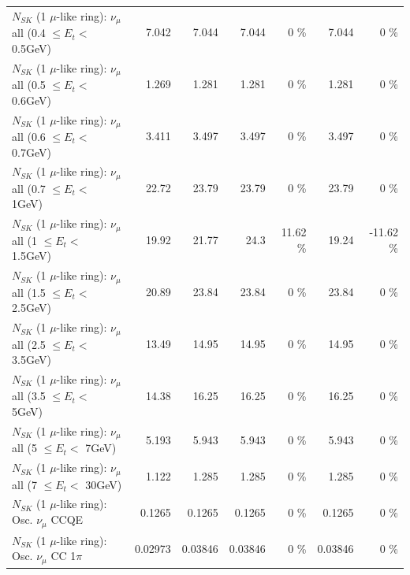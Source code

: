 \begin{table}
\begin{tabular}{| l | r | r | r  r | r  r |}
       $N_{SK}$ (1 $\mu$-like ring): $\nu_{\mu}$ all (0.4 $\leq E_{t} <$ 0.5GeV) &           7.042 &           7.044 &           7.044 &        0 \%  &           7.044 &        0 \%  \\ 
       $N_{SK}$ (1 $\mu$-like ring): $\nu_{\mu}$ all (0.5 $\leq E_{t} <$ 0.6GeV) &           1.269 &           1.281 &           1.281 &        0 \%  &           1.281 &        0 \%  \\ 
       $N_{SK}$ (1 $\mu$-like ring): $\nu_{\mu}$ all (0.6 $\leq E_{t} <$ 0.7GeV) &           3.411 &           3.497 &           3.497 &        0 \%  &           3.497 &        0 \%  \\ 
         $N_{SK}$ (1 $\mu$-like ring): $\nu_{\mu}$ all (0.7 $\leq E_{t} <$ 1GeV) &           22.72 &           23.79 &           23.79 &        0 \%  &           23.79 &        0 \%  \\ 
         $N_{SK}$ (1 $\mu$-like ring): $\nu_{\mu}$ all (1 $\leq E_{t} <$ 1.5GeV) &           19.92 &           21.77 &            24.3 &    11.62 \%  &           19.24 &   -11.62 \%  \\ 
       $N_{SK}$ (1 $\mu$-like ring): $\nu_{\mu}$ all (1.5 $\leq E_{t} <$ 2.5GeV) &           20.89 &           23.84 &           23.84 &        0 \%  &           23.84 &        0 \%  \\ 
       $N_{SK}$ (1 $\mu$-like ring): $\nu_{\mu}$ all (2.5 $\leq E_{t} <$ 3.5GeV) &           13.49 &           14.95 &           14.95 &        0 \%  &           14.95 &        0 \%  \\ 
         $N_{SK}$ (1 $\mu$-like ring): $\nu_{\mu}$ all (3.5 $\leq E_{t} <$ 5GeV) &           14.38 &           16.25 &           16.25 &        0 \%  &           16.25 &        0 \%  \\ 
           $N_{SK}$ (1 $\mu$-like ring): $\nu_{\mu}$ all (5 $\leq E_{t} <$ 7GeV) &           5.193 &           5.943 &           5.943 &        0 \%  &           5.943 &        0 \%  \\ 
          $N_{SK}$ (1 $\mu$-like ring): $\nu_{\mu}$ all (7 $\leq E_{t} <$ 30GeV) &           1.122 &           1.285 &           1.285 &        0 \%  &           1.285 &        0 \%  \\ 
\hline
\hline
                               $N_{SK}$ (1 $\mu$-like ring): Osc. $\nu_\mu$ CCQE &          0.1265 &          0.1265 &          0.1265 &        0 \%  &          0.1265 &        0 \%  \\ 
                          $N_{SK}$ (1 $\mu$-like ring): Osc. $\nu_\mu$ CC 1$\pi$ &         0.02973 &         0.03846 &         0.03846 &        0 \%  &         0.03846 &        0 \%  \\ 

\end{tabular}
\end{table}

